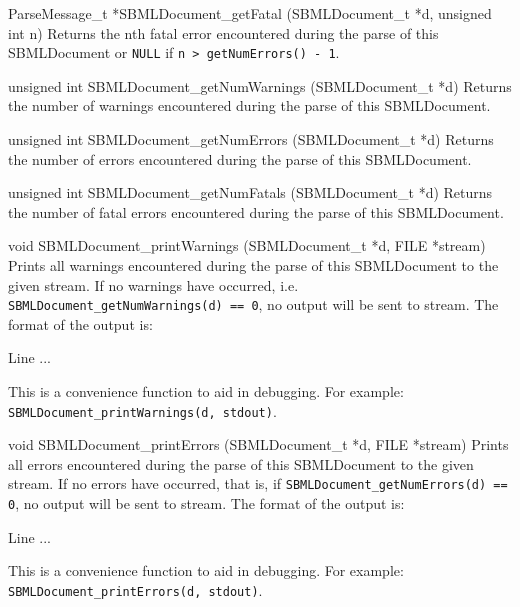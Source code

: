 \documentclass{sbmlmanual}
\begin{document}
\begin{methoddef}{ParseMessage\_t *SBMLDocument\_getFatal (SBMLDocument\_t *d,
unsigned int n)}
   Returns the nth fatal error encountered during the parse of this
   SBMLDocument or \texttt{NULL} if \texttt{n > getNumErrors() - 1}.
 \end{methoddef}


\begin{methoddef}{unsigned int SBMLDocument\_getNumWarnings
(SBMLDocument\_t *d)}
   Returns the number of warnings encountered during the parse of this
   SBMLDocument.
 \end{methoddef}

\begin{methoddef}{unsigned int SBMLDocument\_getNumErrors (SBMLDocument\_t *d)}
   Returns the number of errors encountered during the parse of this
   SBMLDocument.
 \end{methoddef}

\begin{methoddef}{unsigned int SBMLDocument\_getNumFatals (SBMLDocument\_t *d)}
   Returns the number of fatal errors encountered during the parse of this
   SBMLDocument.
 \end{methoddef}
  

\begin{methoddef}{void SBMLDocument\_printWarnings (SBMLDocument\_t *d,
FILE *stream)}
  Prints all warnings encountered during the parse of this SBMLDocument to
  the given stream.  If no warnings have occurred, i.e.
  \texttt{SBMLDocument\_getNumWarnings(d) == 0}, no output will be sent to
  stream. The format of the output is:
  \begin{example}
      Line %
      ...
  \end{example}
  This is a convenience function to aid in debugging.  For example:\\
  \texttt{SBMLDocument\_printWarnings(d, stdout)}.
 \end{methoddef}
  

\begin{methoddef}{void SBMLDocument\_printErrors (SBMLDocument\_t *d,
FILE *stream)}
  Prints all errors encountered during the parse of this SBMLDocument
  to the given stream.  If no errors have occurred, that is, if 
  \texttt{SBMLDocument\_getNumErrors(d) == 0}, no output will be sent
  to stream. The format of the output is:
  \begin{example}
      Line %
      ...
  \end{example}
  This is a convenience function to aid in debugging.  For example:\\
  \texttt{SBMLDocument\_printErrors(d, stdout)}.
 \end{methoddef}
  
\end{document}
